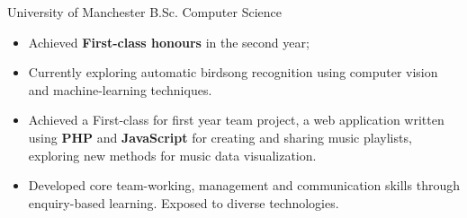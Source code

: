 \documentclass[12pt,a4paper]{article}
\begin{document}
\noindent{}



       {University of Manchester}
       {B.Sc. Computer Science}
{%
  \begin{itemize}
    \item Achieved {\bfseries First-class honours} in the second year;

    \item Currently exploring automatic birdsong recognition using
      computer vision and machine-learning techniques.

    \item Achieved a First-class for first year team project, a web application
      written using {\bfseries PHP} and {\bfseries JavaScript} for creating and
      sharing music playlists, exploring new methods for music data
      visualization.

    \item Developed core team-working, management and communication skills
      through enquiry-based learning. Exposed to diverse technologies.

  \end{itemize}
}


\end{document}
